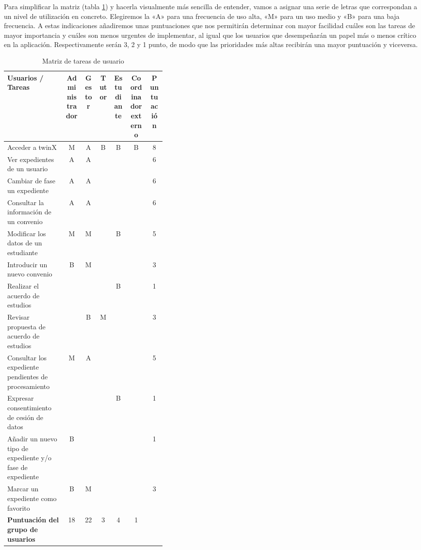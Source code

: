 Para simplificar la matriz (tabla \ref{tab:matrizTareas}) y hacerla visualmente más sencilla de entender, vamos a asignar una serie de letras que correspondan a un nivel de utilización en concreto. Elegiremos la «A» para una frecuencia de uso alta, «M» para un uso medio y «B» para una baja frecuencia. A estas indicaciones añadiremos unas puntuaciones que nos permitirán determinar con mayor facilidad cuáles son las tareas de mayor importancia y cuáles son menos urgentes de implementar, al igual que los usuarios que desempeñarán un papel más o menos crítico en la aplicación. Respectivamente serán 3, 2 y 1 punto, de modo que las prioridades más altas recibirán una mayor puntuación y viceversa.

\begin{table}[h]
	\begin{center}
		\begin{adjustbox}{width=1\textwidth}
		\begin{tabular}{ | >{\centering\arraybackslash}p{0.375\linewidth} | c | c | c | c | c | c | } 
			\hline
			\textbf{Usuarios / Tareas} & \textbf{Administrador} & \textbf{Gestor} & \textbf{Tutor} & \textbf{Estudiante} & \textbf{Coordinador externo} & \textbf{Puntuación} \\
			\hline
			Acceder a twinX & M & A & B & B & B & \cellcolor{red!25}8 \\
			\hline
			Ver expedientes de un usuario & A & A & & & & \cellcolor{red!25}6 \\
			\hline
			Cambiar de fase un expediente & A & A & & & & \cellcolor{red!25}6 \\ 
			\hline
			Consultar la información de un convenio & A & A & & & & \cellcolor{red!25}6 \\ 
			\hline
			Modificar los datos de un estudiante & M & M & & B & & \cellcolor{red!25}5 \\
			\hline
			Introducir un nuevo convenio & B & M & & & & 3 \\
			\hline
			Realizar el acuerdo de estudios & & & & B & & 1 \\
			\hline
			Revisar propuesta de acuerdo de estudios & & B & M & & & 3 \\
			\hline
			Consultar los expediente pendientes de procesamiento & M & A & & & & 5 \\
			
			\hline
			Expresar consentimiento de cesión de datos & & & & B & & 1 \\
			\hline
			Añadir un nuevo tipo de expediente y/o fase de expediente & B & & &  & & 1 \\
			\hline
			Marcar un expediente como favorito & B & M & & & & 3 \\
			\hline	
			\textbf{Puntuación del grupo de usuarios} & \cellcolor{red!25}18 & \cellcolor{red!25}22 & 3 & 4 & 1 &  \\
			\hline
	\end{tabular}

	\end{adjustbox}
		\caption{Matriz de tareas de usuario}
		\label{tab:matrizTareas}
	\end{center}
\end{table}

